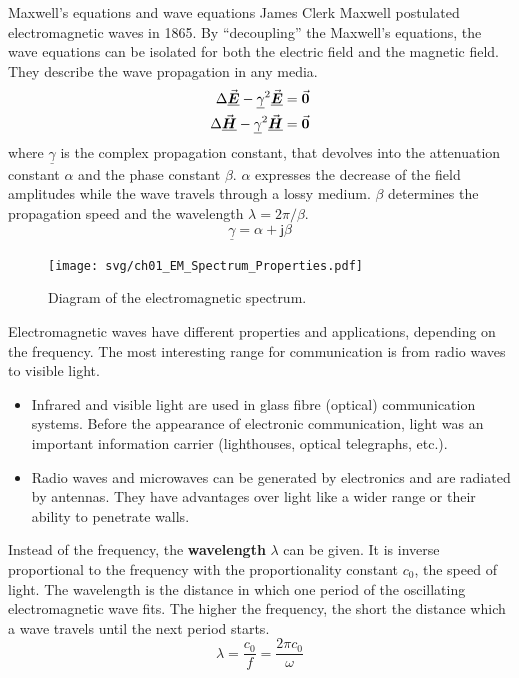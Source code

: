 \begin{refsection}
\begin{excursus}{Maxwell's equations and wave equations}
	James Clerk Maxwell postulated electromagnetic waves in 1865. By ``decoupling'' the Maxwell's equations, the wave equations can be isolated for both the electric field and the magnetic field. They describe the wave propagation in any media.
	\begin{subequations}
		\begin{align}
			\Delta \vec{\bm{\underline{E}}} - \underline{\gamma}^2 \vec{\bm{\underline{E}}} &= \vec{\bm{0}} \\
			\Delta \vec{\bm{\underline{H}}} - \underline{\gamma}^2 \vec{\bm{\underline{H}}} &= \vec{\bm{0}}
		\end{align}
	\end{subequations}
	where $\underline{\gamma}$ is the complex propagation constant, that devolves into the attenuation constant $\alpha$ and the phase constant $\beta$. $\alpha$ expresses the decrease of the field amplitudes while the wave travels through a lossy medium. $\beta$ determines the propagation speed and the wavelength $\lambda = 2 \pi / \beta$.
	\begin{equation}
		\underline{\gamma} = \alpha + \mathsf{j} \beta
	\end{equation}
\end{excursus}

\begin{figure}[H]
	\centering
	\texttt{[image: svg/ch01\_EM\_Spectrum\_Properties.pdf]}
	\caption{Diagram of the electromagnetic spectrum. }
\end{figure}

Electromagnetic waves have different properties and applications, depending on the frequency. The most interesting range for communication is from radio waves to visible light.
\begin{itemize}
	\item Infrared and visible light are used in glass fibre (optical) communication systems. Before the appearance of electronic communication, light was an important information carrier (lighthouses, optical telegraphs, etc.).
	\item Radio waves and microwaves can be generated by electronics and are radiated by antennas. They have advantages over light like a wider range or their ability to penetrate walls.
\end{itemize}

Instead of the frequency, the  \textbf{wavelength} $\lambda$ can be given. It is inverse proportional to the frequency with the proportionality constant $c_0$, the speed of light. The wavelength is the distance in which one period of the oscillating electromagnetic wave fits. The higher the frequency, the short the distance which a wave travels until the next period starts.
\begin{equation}
	\lambda = \frac{c_0}{f} = \frac{2 \pi c_0}{\omega}
\end{equation}


\end{refsection}

